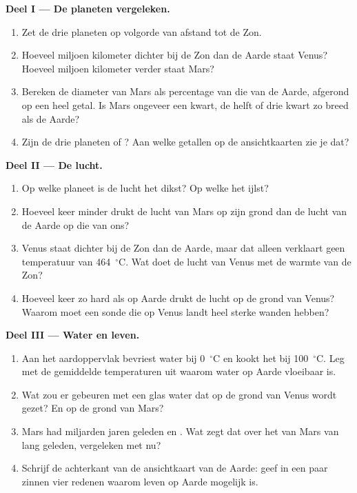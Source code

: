 \begin{problem}
\medskip
\noindent\textbf{Deel I --- De planeten vergeleken.}
\begin{enumerate}
  \item Zet de drie planeten op volgorde van afstand tot de Zon.
  \item Hoeveel miljoen kilometer dichter bij de Zon dan de Aarde staat
        Venus? Hoeveel miljoen kilometer verder staat Mars?
  \item Bereken de diameter van Mars als percentage van die van de Aarde,
        afgerond op een heel getal. Is Mars ongeveer een kwart, de helft of
        drie kwart zo breed als de Aarde?
  \item Zijn de drie planeten  of ? Aan welke
        getallen op de ansichtkaarten zie je dat?
\end{enumerate}

\medskip
\noindent\textbf{Deel II --- De lucht.}
\begin{enumerate}[resume]
  \item Op welke planeet is de lucht het dikst? Op welke het ijlst?
  \item Hoeveel keer minder drukt de lucht van Mars op zijn grond dan de
        lucht van de Aarde op die van ons?
  \item Venus staat dichter bij de Zon dan de Aarde, maar dat alleen
        verklaart geen temperatuur van 464~$^\circ$C. Wat doet de lucht van
        Venus met de warmte van de Zon?
  \item Hoeveel keer zo hard als op Aarde drukt de lucht op de grond van
        Venus? Waarom moet een sonde die op Venus landt heel sterke wanden hebben?
\end{enumerate}

\medskip
\noindent\textbf{Deel III --- Water en leven.}
\begin{enumerate}[resume]
  \item Aan het aardoppervlak bevriest water bij 0~$^\circ$C en kookt het
        bij 100~$^\circ$C. Leg met de gemiddelde temperaturen uit waarom
        water op Aarde vloeibaar is.
  \item Wat zou er gebeuren met een glas water dat op de grond van Venus
        wordt gezet? En op de grond van Mars?
  \item Mars had miljarden jaren geleden  en . Wat zegt dat
        over het  van Mars van lang geleden, vergeleken met nu?
  \item Schrijf de achterkant van de ansichtkaart van de Aarde: geef in een
        paar zinnen vier redenen waarom leven op Aarde mogelijk is.
\end{enumerate}
\end{problem}
